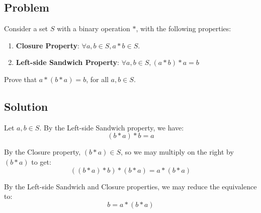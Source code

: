 \documentclass{article}
\begin{document}
\begin{center}\item \section*{Problem}\end{center}

Consider a set $S$ with a binary operation $*$, with the following properties:
\begin{enumerate}
  \item \textbf{Closure Property}: $\forall a,b \in S, a*b \in S$.
  \item \textbf{Left-side Sandwich Property}: $\forall a,b \in S, (a*b)*a=b$
\end{enumerate}
Prove that $a*(b*a)=b$, for all $a,b \in S$.

\begin{center}\item \section*{Solution}\end{center}

Let $a,b \in S$.
By the Left-side Sandwich property, we have:
$$
  (b*a)*b = a
$$

By the Closure property, $(b*a) \in S$, so we may multiply on the right by
$(b*a)$ to get:
$$
  ((b*a)*b)*(b*a) = a*(b*a)
$$

By the Left-side Sandwich and Closure properties, we may reduce the equivalence to:
$$
  b = a*(b*a)
$$

\end{document}
